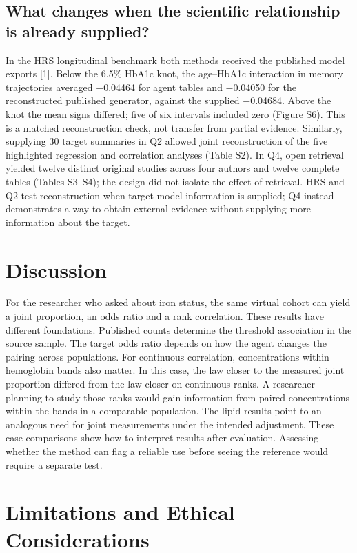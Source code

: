 \documentclass[11pt,letterpaper]{article}
\begin{document}
\subsection{What changes when the scientific relationship is already supplied?}

In the HRS longitudinal benchmark both methods received the published model exports [1]. Below the 6.5\% HbA1c knot, the age–\allowbreak{}HbA1c interaction in memory trajectories averaged −0.04464 for agent tables and −0.04050 for the reconstructed published generator, against the supplied −0.04684. Above the knot the mean signs differed; five of six intervals included zero (Figure S6). This is a matched reconstruction check, not transfer from partial evidence. Similarly, supplying 30 target summaries in Q2 allowed joint reconstruction of the five highlighted regression and correlation analyses (Table S2). In Q4, open retrieval yielded twelve distinct original studies across four authors and twelve complete tables (Tables S3–\allowbreak{}S4); the design did not isolate the effect of retrieval. HRS and Q2 test reconstruction when target-model information is supplied; Q4 instead demonstrates a way to obtain external evidence without supplying more information about the target.


\section{Discussion}

For the researcher who asked about iron status, the same virtual cohort can yield a joint proportion, an odds ratio and a rank correlation. These results have different foundations. Published counts determine the threshold association in the source sample. The target odds ratio depends on how the agent changes the pairing across populations. For continuous correlation, concentrations within hemoglobin bands also matter. In this case, the law closer to the measured joint proportion differed from the law closer on continuous ranks. A researcher planning to study those ranks would gain information from paired concentrations within the bands in a comparable population. The lipid results point to an analogous need for joint measurements under the intended adjustment. These case comparisons show how to interpret results after evaluation. Assessing whether the method can flag a reliable use before seeing the reference would require a separate test.


\section{Limitations and Ethical Considerations}
\end{document}
